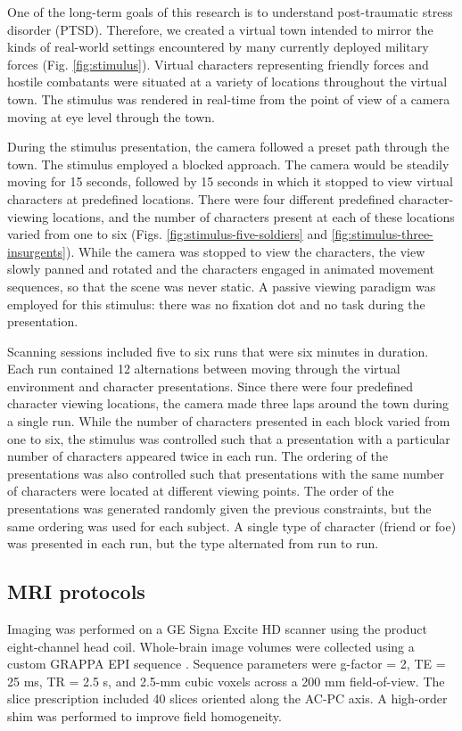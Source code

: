 \documentclass[5p,authoryear]{elsarticle}
\begin{document}
One of the long-term goals of this research is to understand post-traumatic stress disorder (PTSD).
Therefore, we created a virtual town intended to mirror the kinds of real-world settings encountered by many currently deployed military forces (Fig. \ref{fig:stimulus}).
Virtual characters representing friendly forces and hostile combatants were situated at a variety of locations throughout the virtual town.
The stimulus was rendered in real-time from the point of view of a camera moving at eye level through the town. 

During the stimulus presentation, the camera followed a preset path through the town.
The stimulus employed a blocked approach. The camera would be steadily moving for 15 seconds, followed by 15 seconds in which it stopped to view virtual characters at predefined locations.
There were four different predefined character-viewing locations, and the number of characters present at each of these locations varied from one to six (Figs. \ref{fig:stimulus-five-soldiers} and \ref{fig:stimulus-three-insurgents}).
While the camera was stopped to view the characters, the view slowly panned and rotated and the characters engaged in animated movement sequences, so that the scene was never static.
A passive viewing paradigm was employed for this stimulus: there was no fixation dot and no task during the presentation.

Scanning sessions included five to six runs that were six minutes in duration.
Each run contained 12 alternations between moving through the virtual environment and character presentations. 
Since there were four predefined character viewing locations, the camera made three laps around the town during a single run.
While the number of characters presented in each block varied from one to six, the stimulus was controlled such that a presentation with a particular number of characters appeared twice in each run.
The ordering of the presentations was also controlled such that presentations with the same number of characters were located at different viewing points.
The order of the presentations was generated randomly given the previous constraints, but the same ordering was used for each subject.
A single type of character (friend or foe) was presented in each run, but the type alternated from run to run.

\subsection{MRI protocols}
Imaging was performed on a GE Signa Excite HD scanner using the product eight-channel head coil.
Whole-brain image volumes were collected using a custom GRAPPA EPI sequence \citep{Griswold2002}. 
Sequence parameters were g-factor = 2,  TE = 25 ms, TR = 2.5 s, and  2.5-mm cubic voxels across a 200 mm field-of-view. 
The slice prescription included 40 slices oriented along the AC-PC axis. 
A high-order shim was  performed to improve field homogeneity.
\end{document}
